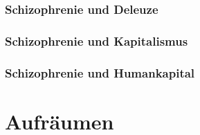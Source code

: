 \documentclass[12pt,
               DIV13,
               paper=a4,
               twoside=false,
               onehalfspacing,
               bibliography=totoc,
               toc=graduated,
               draft,
               ]{scrartcl}
\begin{document}
\subsubsection{Schizophrenie und Deleuze}

\subsubsection{Schizophrenie und Kapitalismus}

\subsubsection{Schizophrenie und Humankapital}

\section{Aufräumen}

\newpage
\nocite{*}
\printshorthands
\printbibliography
\end{document}
